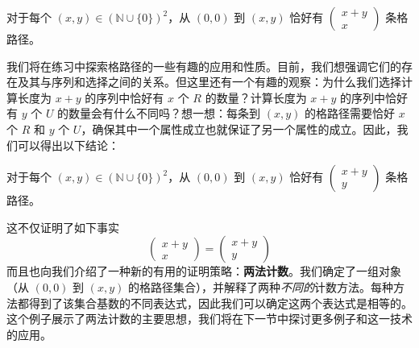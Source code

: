 \begin{example}
    \begin{proposition}
        对于每个 $(x,y) \in (\mathbb{N} \cup \{0\})^2$，从 $(0,0)$ 到 $(x,y)$ 恰好有 $\begin{pmatrix}
                x+y \\x
            \end{pmatrix}$ 条格路径。
    \end{proposition}

    我们将在练习中探索格路径的一些有趣的应用和性质。目前，我们想强调它们的存在及其与序列和选择之间的关系。但这里还有一个有趣的观察：为什么我们选择计算长度为 $x+y$ 的序列中恰好有 $x$ 个 $R$ 的数量？计算长度为 $x+y$ 的序列中恰好有 $y$ 个 $U$ 的数量会有什么不同吗？想一想：每条到 $(x, y)$ 的格路径需要恰好 $x$ 个 $R$ 和 $y$ 个 $U$，确保其中一个属性成立也就保证了另一个属性的成立。因此，我们可以得出以下结论：

    \begin{proposition}
        对于每个 $(x,y) \in (\mathbb{N} \cup \{0\})^2$，从 $(0,0)$ 到 $(x,y)$ 恰好有 $\begin{pmatrix}
            x+y \\y
        \end{pmatrix}$ 条格路径。
    \end{proposition}

    这不仅证明了如下事实
    \[\begin{pmatrix}x+y \\x\end{pmatrix} = \begin{pmatrix}x+y \\y\end{pmatrix}\]
    而且也向我们介绍了一种新的有用的证明策略：\textbf{两法计数}。我们确定了一组对象（从 $(0, 0)$ 到 $(x, y)$ 的格路径集合），并解释了两种\emph{不同的}计数方法。每种方法都得到了该集合基数的不同表达式，因此我们可以确定这两个表达式是相等的。这个例子展示了两法计数的主要思想，我们将在下一节中探讨更多例子和这一技术的应用。
\end{example}